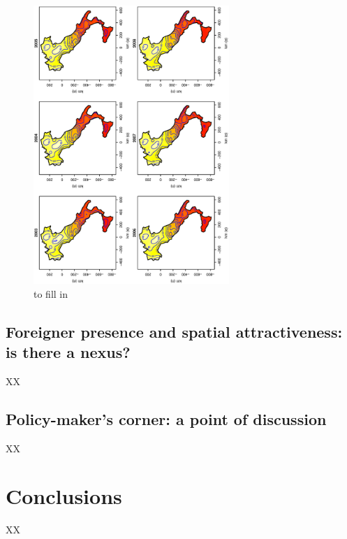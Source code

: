 \documentclass[10pt] {article}
\theoremstyle{definition}
\theoremstyle{plain}
\begin{document}
\begin{figure}[htbp]
	\centering
		\includegraphics[width=0.66\textwidth, angle=270]{index.eps}
	\caption{to fill in}
	\label{fig3}
\end{figure}


\subsection{Foreigner presence and spatial attractiveness: is there a nexus? \label{NEX}}
XX

\subsection{Policy-maker's corner: a point of discussion \label{PM}}
XX

\section{Conclusions \label{CONC}}
XX
\end{document}
